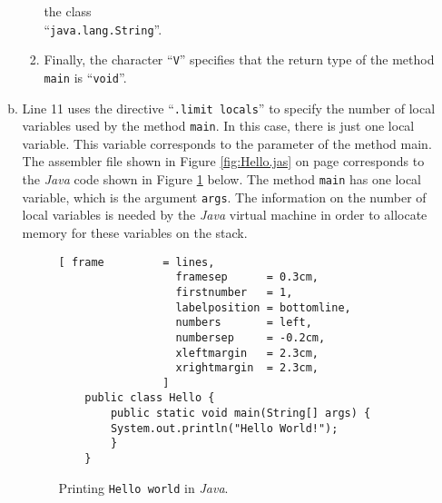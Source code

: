 \begin{enumerate}
\begin{enumerate}[(a)]
\begin{enumerate}
              the class \\
              ``\texttt{java.lang.String}''.
        \item Finally, the character ``\texttt{V}'' specifies that the return type of the method \texttt{main}
              is ``\texttt{void}''.
       \end{enumerate}
  \item Line 11 uses the directive ``\texttt{.limit locals}'' to specify the number of local variables 
        used by the method \texttt{main}.  In this case, there is just one local variable.  This variable
        corresponds to the parameter of the method main.  The assembler file shown in Figure
        \ref{fig:Hello.jas} on page \pageref{fig:Hello.jas} corresponds to the \textsl{Java} code
        shown in Figure \ref{fig:Hello.java} below.  The method \texttt{main} has one local
        variable, which is the argument \texttt{args}.
        The information on the number of local variables is needed by the \textsl{Java} virtual
        machine in order to allocate memory for these variables on the stack.

\begin{figure}[!ht]
\centering
\begin{Verbatim}[ frame         = lines, 
                  framesep      = 0.3cm, 
                  firstnumber   = 1,
                  labelposition = bottomline,
                  numbers       = left,
                  numbersep     = -0.2cm,
                  xleftmargin   = 2.3cm,
                  xrightmargin  = 2.3cm,
                ]
    public class Hello {
        public static void main(String[] args) {
    	System.out.println("Hello World!");
        }
    }
\end{Verbatim}
\vspace*{-0.3cm}
\caption{Printing \texttt{Hello world} in \textsl{Java}.} 
\label{fig:Hello.java}
\end{figure}


\end{enumerate}
\end{enumerate}
